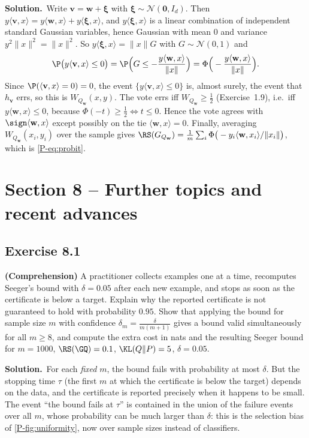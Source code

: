 \documentclass[11pt]{article}
\newcommand{\statement}[1]{\begin{tcolorbox}[enhanced,breakable,colback=black!3,colframe=black!25,boxrule=0.4pt,sharp corners,fontupper=\itshape\small]#1\end{tcolorbox}}
\newcommand{\exo}[1]{\Needspace{6\baselineskip}\subsection*{Exercise #1}\addcontentsline{toc}{subsection}{Exercise #1}}
\newcommand{\sol}{\noindent\textbf{Solution.}\ }
\begin{document}
\sol Write $\mathbf v=\mathbf w+\boldsymbol\xi$ with $\boldsymbol\xi\sim\mathcal N(\mathbf 0,I_d)$. Then $y\langle\mathbf v,x\rangle=y\langle\mathbf w,x\rangle+y\langle\boldsymbol\xi,x\rangle$, and $y\langle\boldsymbol\xi,x\rangle$ is a
linear combination of independent standard Gaussian variables, hence Gaussian with mean $0$ and variance $y^2\|x\|^2=\|x\|^2$. So
$y\langle\boldsymbol\xi,x\rangle=\|x\|G$ with $G\sim\mathcal N(0,1)$ and
\[
\P\big(y\langle\mathbf v,x\rangle\leq0\big)=\P\Big(G\leq-\frac{y\langle\mathbf w,x\rangle}{\|x\|}\Big)=\Phi\Big(-\frac{y\langle\mathbf w,x\rangle}{\|x\|}\Big).
\]
Since $\P(\langle\mathbf v,x\rangle=0)=0$, the event $\{y\langle\mathbf v,x\rangle\leq0\}$ is, almost surely, the event that $h_{\mathbf v}$ errs, so this is
$W_{Q_{\mathbf w}}(x,y)$. The vote errs iff $W_{Q_{\mathbf w}}\geq\frac12$ (Exercise~1.9), i.e.\ iff $y\langle\mathbf w,x\rangle\leq0$, because $\Phi(-t)\geq\frac12\iff t\leq0$.
Hence the vote agrees with $\sign\langle\mathbf w,x\rangle$ except possibly on the tie $\langle\mathbf w,x\rangle=0$. Finally, averaging
$W_{Q_{\mathbf w}}(x_i,y_i)$ over the sample gives $\RS(G_{Q_{\mathbf w}})=\frac1m\sum_i\Phi\big(-y_i\langle\mathbf w,x_i\rangle/\|x_i\|\big)$, which is
\eqref{P-eq:probit}.

\section*{Section 8 -- Further topics and recent advances}

\exo{8.1}
\statement{\textbf{(Comprehension)} A practitioner collects examples one at a time, recomputes Seeger's bound with $\delta=0.05$ after
each new example, and stops as soon as the certificate is below a target. Explain why the reported certificate is not
guaranteed to hold with probability $0.95$. Show that applying the bound for sample size $m$ with confidence
$\delta_m=\frac{\delta}{m(m+1)}$ gives a bound valid simultaneously for all $m\geq8$, and compute the extra cost in nats and the resulting
Seeger bound for $m=1000$, $\RS(\GQ)=0.1$, $\KL(Q\|P)=5$, $\delta=0.05$.}

\sol For each \emph{fixed} $m$, the bound fails with probability at most $\delta$. But the stopping time $\tau$ (the first $m$ at
which the certificate is below the target) depends on the data, and the certificate is reported precisely when it
happens to be small. The event ``the bound fails at $\tau$'' is contained in the union of the failure events over all
$m$, whose probability can be much larger than $\delta$: this is the selection bias of \cref{P-fig:uniformity}, now over sample
sizes instead of classifiers.
\end{document}
